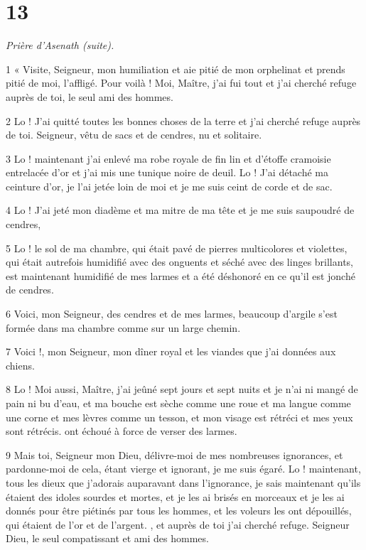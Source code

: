 \chapter{13}

\par \textit{Prière d'Asenath (suite).}

\par 1 « Visite, Seigneur, mon humiliation et aie pitié de mon orphelinat et prends pitié de moi, l'affligé. Pour voilà ! Moi, Maître, j'ai fui tout et j'ai cherché refuge auprès de toi, le seul ami des hommes.

\par 2 Lo ! J'ai quitté toutes les bonnes choses de la terre et j'ai cherché refuge auprès de toi. Seigneur, vêtu de sacs et de cendres, nu et solitaire.

\par 3 Lo ! maintenant j'ai enlevé ma robe royale de fin lin et d'étoffe cramoisie entrelacée d'or et j'ai mis une tunique noire de deuil. Lo ! J'ai détaché ma ceinture d'or, je l'ai jetée loin de moi et je me suis ceint de corde et de sac.

\par 4 Lo ! J'ai jeté mon diadème et ma mitre de ma tête et je me suis saupoudré de cendres,

\par 5 Lo ! le sol de ma chambre, qui était pavé de pierres multicolores et violettes, qui était autrefois humidifié avec des onguents et séché avec des linges brillants, est maintenant humidifié de mes larmes et a été déshonoré en ce qu'il est jonché de cendres.

\par 6 Voici, mon Seigneur, des cendres et de mes larmes, beaucoup d'argile s'est formée dans ma chambre comme sur un large chemin.

\par 7 Voici !, mon Seigneur, mon dîner royal et les viandes que j'ai données aux chiens.

\par 8 Lo ! Moi aussi, Maître, j'ai jeûné sept jours et sept nuits et je n'ai ni mangé de pain ni bu d'eau, et ma bouche est sèche comme une roue et ma langue comme une corne et mes lèvres comme un tesson, et mon visage est rétréci et mes yeux sont rétrécis. ont échoué à force de verser des larmes.

\par 9 Mais toi, Seigneur mon Dieu, délivre-moi de mes nombreuses ignorances, et pardonne-moi de cela, étant vierge et ignorant, je me suis égaré. Lo ! maintenant, tous les dieux que j'adorais auparavant dans l'ignorance, je sais maintenant qu'ils étaient des idoles sourdes et mortes, et je les ai brisés en morceaux et je les ai donnés pour être piétinés par tous les hommes, et les voleurs les ont dépouillés, qui étaient de l'or et de l'argent. , et auprès de toi j'ai cherché refuge. Seigneur Dieu, le seul compatissant et ami des hommes.

